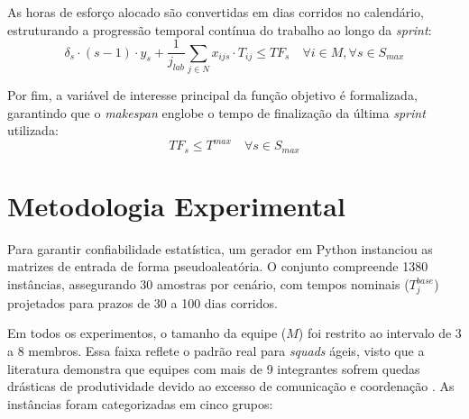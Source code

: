 \documentclass[a4paper,11pt]{article}
\begin{document}
As horas de esforço alocado são convertidas em dias corridos no calendário, 
estruturando a progressão temporal contínua do trabalho ao longo da \textit{sprint}:
\begin{equation}
    \delta_s \cdot (s-1) \cdot y_s + \frac{1}{j_{lab}} \sum_{j \in N} x_{ijs} \cdot T_{ij} \le TF_s \quad \forall i \in M, \forall s \in S_{max}
\end{equation}

Por fim, a variável de interesse principal da função objetivo é formalizada, 
garantindo que o \textit{makespan} englobe o tempo de finalização da última 
\textit{sprint} utilizada:
\begin{equation}
    TF_s \le T^{max} \quad \forall s \in S_{max}
\end{equation}

\section{Metodologia Experimental}

Para garantir confiabilidade estatística, um gerador em Python instanciou as matrizes de entrada 
de forma pseudoaleatória. O conjunto compreende 1380 instâncias, assegurando 30 amostras por 
cenário, com tempos nominais ($T^{base}_j$) projetados para prazos de 30 a 100 dias corridos. 

Em todos os experimentos, o tamanho da equipe ($M$) foi restrito ao intervalo de 3 a 8 membros. 
Essa faixa reflete o padrão real para \textit{squads} ágeis, visto que a literatura demonstra 
que equipes com mais de 9 integrantes sofrem quedas drásticas de produtividade devido ao excesso 
de comunicação e coordenação \cite{kniberg2012, schwaber2017}. As instâncias foram categorizadas 
em cinco grupos:
\end{document}
